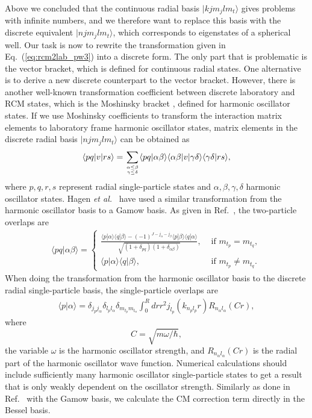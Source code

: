 \documentclass[a4paper,12pt]{report}
\begin{document}
Above we concluded that the continuous radial basis
$|kjm_{j}lm_{t}\rangle $ gives problems with infinite numbers, 
and we therefore want to replace this basis with the
discrete equivalent $|njm_{j}lm_{t}\rangle $, which 
corresponds to eigenstates of a spherical well. 
Our task is now to rewrite the transformation given in 
Eq.~(\ref{eq:rcm2lab_pw3}) into a discrete form. The 
only part that is problematic is the vector bracket,
which is defined for continuous radial states. One
alternative is to derive a new discrete counterpart to the
vector bracket. However, there is another well-known 
transformation coefficient between discrete laboratory
and RCM states, which is the Moshinsky bracket \cite{lawson}, 
defined for harmonic oscillator states. If we use
Moshinsky coefficients to transform the interaction
matrix elements to laboratory frame harmonic oscillator
states, matrix elements in the discrete radial basis
$|njm_{j}lm_{t}\rangle $ can be obtained as 
\begin{align}
\langle pq|v|rs\rangle = 
\sum_{\alpha \leq \beta \atop \gamma \leq \delta }
\langle pq|\alpha \beta \rangle 
\langle \alpha \beta |v|\gamma \delta \rangle 
\langle \gamma \delta |rs\rangle ,
\end{align}
where $p,q,r,s$ represent radial single-particle states
and $\alpha , \beta , \gamma , \delta $ harmonic
oscillator states. Hagen \emph{et al.}~\cite{hagen2006} 
have used a similar transformation from the harmonic oscillator 
basis to a Gamow basis. As given in 
Ref.~\cite{hagen2006}, the two-particle overlaps are 
\begin{align}
  \langle pq|\alpha \beta \rangle = \left\{ \begin{array}{ll}
    \frac{\langle p|\alpha \rangle \langle q|\beta \rangle 
      - (-1)^{J-j_{\alpha }-j_{\beta }}\langle p|\beta \rangle 
    \langle q|\alpha \rangle }
         {\sqrt{ (1+\delta_{pq})(1+\delta_{\alpha \beta })
           }}, & \text{ if } m_{t_{p}} = m_{t_{q}}, \\
         \langle p|\alpha \rangle \langle q|\beta \rangle ,
         & \text{ if } m_{t_{p}} \neq m_{t_{q}}.
         \end{array} \right.
\end{align}
When doing the transformation from the harmonic oscillator 
basis to the discrete radial single-particle basis, 
the single-particle overlaps are
\begin{align}
  \langle p|\alpha \rangle = 
  \delta_{j_{p}j_{\alpha}}\delta_{l_{p}l_{\alpha }}
  \delta_{m_{t_{p}}m_{t_{\alpha }}} \int_{0}^{R}dr r^{2}
  j_{l_{p}}(k_{n_{p}l_{p}}r)R_{n_{\alpha }l_{\alpha }}(Cr),
\end{align}
where
\[
C = \sqrt{m\omega /\hbar },
\]
the variable $\omega $ is the harmonic oscillator strength,
and $R_{n_{\alpha }l_{\alpha }}(Cr)$ is the radial part of the
harmonic oscillator wave function. Numerical calculations
should include sufficiently many harmonic oscillator 
single-particle states to get a result that is only
weakly dependent on the oscillator strength. Similarly
as done in Ref.~\cite{hagen2006} with the Gamow basis,
we calculate the CM correction term directly in the 
Bessel basis.
\end{document}
